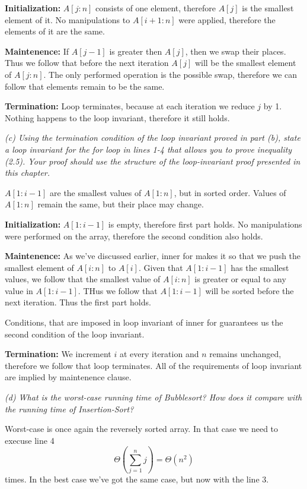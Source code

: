 \documentclass[11pt,oneside,titlepage]{book}
\begin{document}
\textbf{Initialization: }
$A[j:n]$ consists of one element, therefore $A[j]$ is the smallest element of it. No
manipulations to $A[i + 1: n]$ were applied, therefore the elements of it are the same.

\textbf{Maintenence: }
If $A[j - 1]$ is greater then $A[j]$, then we swap their places. Thus we follow that
before the next iteration $A[j]$ will be the smallest element of $A[j:n]$. The only performed
operation is the possible swap, therefore we can follow that elements remain to be the same.

\textbf{Termination: }
Loop terminates, because at each iteration we reduce $j$ by 1. Nothing happens to the loop
invariant, therefore it still holds.

\textit{(c) Using the termination condition of the loop invariant proved in part (b), state
  a loop invariant for the for loop in lines 1-4 that allows you to prove inequality
  (2.5). Your proof should use the structure of the loop-invariant proof presented
  in this chapter.}


$A[1:i - 1]$ are the smallest values of $A[1:n]$, but in sorted order.
Values of $A[1:n]$ remain the same, but their place may change.

\textbf{Initialization: }
$A[1:i - 1]$ is empty, therefore first part holds. No manipulations were performed on the
array, therefore the second condition also holds.

\textbf{Maintenence: }
As we've discussed earlier, inner for makes it so that we push the smallest element of $A[i:n]$
to $A[i]$. Given that $A[1: i-1]$ has the smallest values, we follow that the smallest value
of $A[i:n]$ is greater or equal to any value in $A[1:i-1]$. THus we follow that $A[1:i - 1]$
will be sorted before the next iteration. Thus the first part holds.

Conditions, that are imposed in loop invariant of inner for guarantees us the second condition
of the loop invariant.

\textbf{Termination: }
We increment $i$ at every iteration and $n$ remains unchanged, therefore we follow that
loop terminates. All of the requirements of loop invariant are implied by maintenence clause.

\textit{(d) What is the worst-case running time of Bubblesort? How does it compare with
  the running time of Insertion-Sort?}

Worst-case is once again the reversely sorted array. In that case we need to
execuse line 4
$$\Theta(\sum_{j = 1}^n{j}) = \Theta(n^2)$$
times. In the best case we've got the same case, but now with the line 3.
\end{document}
